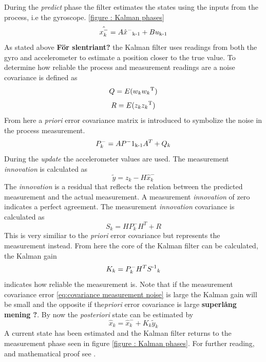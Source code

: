 \documentclass[a4paper,11pt]{kth-mag}
\begin{document}
During the \textit{predict} phase the filter estimates the states using the inputs from the process, i.e the gyroscope. \ref{figure : Kalman phases}
\begin{equation}
\hat{x^-_k} = A\hat{x}^-\textsubscript{k-1}+Bu\textsubscript{k-1}
\end{equation}
As stated above \textbf{För slentriant?} the Kalman filter uses readings from both the gyro and accelerometer to estimate a position closer to the true value. To determine how reliable the process and measurement readings are a noise covariance is defined as
\begin{equation} \label{eq:covariance process noise}
Q = E(w_k w_k \textsuperscript{T})
\end{equation}
\begin{equation} \label{eq:covariance measurement noise}
R = E(z_k z_k \textsuperscript{T} )
\end{equation}
From here a \textit{priori} error covariance matrix is introduced to symbolize the noise in the process measurement.
\begin{equation}
P^-_k = AP^-1\textsubscript{k-1}A^T + Q_k
\end{equation}
During the \textit{update} the accelerometer values are used. The measurement \textit{innovation} is calculated as
\begin{equation}
\tilde{y} = z_k - H\hat{x}^-_k
\end{equation}
The \textit{innovation} is a residual that reflects the relation between the predicted measurement and the actual measurement. A measurement \textit{innovation} of zero indicates a perfect agreement.
The measurement \textit{innovation} covariance is calculated as
\begin{equation}
S_k = HP^-_kH^T + R
\end{equation}
This is very similiar to the \textit{priori} error covariance but represents the measurement instead. From here the core of the Kalman filter can be calculated, the Kalman gain
\begin{equation}
K_k = P^-_kH^TS\textsuperscript{-1}_k
\end{equation}
indicates how reliable the measurement is. Note that if the measurement covariance error \eqref{eq:covariance measurement noise} is large the Kalman gain will be small and the opposite if the\textit{priori} error covariance is large \textbf{superlång mening ?}.
By now the \textit{posteriori} state can be estimated by
\begin{equation}
\hat{x}_k = \hat{x}^-_k + K_k\tilde{y}_k
\end{equation}
A current state has been estimated and the Kalman filter returns to the measurement phase seen in figure \ref{figure : Kalman phases}.
For further reading, and mathematical proof see \cite{Kalmanintro}.
\end{document}
